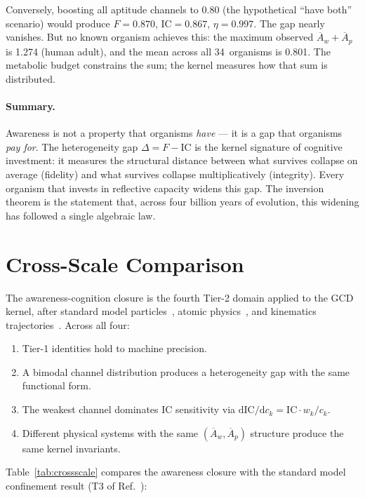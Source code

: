 \documentclass[
  aps,
  prd,
  twocolumn,
  superscriptaddress,
  nofootinbib,
  floatfix
]{revtex4-2}
\newcommand{\dd}{\mathrm{d}}
\newcommand{\IC}{\mathrm{IC}}
\newcommand{\Aw}{\overline{A}_{\!w}}
\newcommand{\Ap}{\overline{A}_{\!p}}
\begin{document}
Conversely, boosting all aptitude channels to $0.80$
(the hypothetical ``have both'' scenario) would produce
$F = 0.870$, $\IC = 0.867$, $\eta = 0.997$.  The gap
nearly vanishes.  But no known organism achieves this:
the maximum observed $\Aw + \Ap$ is 1.274 (human adult),
and the mean across all 34~organisms is 0.801.  The
metabolic budget constrains the sum; the kernel measures
how that sum is distributed.

\paragraph{Summary.}
Awareness is not a property that organisms \emph{have} ---
it is a gap that organisms \emph{pay for}.  The heterogeneity
gap $\Delta = F - \IC$ is the kernel signature of cognitive
investment: it measures the structural distance between what
survives collapse on average (fidelity) and what survives
collapse multiplicatively (integrity).  Every organism that
invests in reflective capacity widens this gap.  The inversion
theorem is the statement that, across four billion years of
evolution, this widening has followed a single algebraic law.

\section{Cross-Scale Comparison}\label{sec:crossscale}

The awareness-cognition closure is the fourth Tier-2 domain
applied to the GCD kernel, after standard model
particles~\cite{paulus2026sm}, atomic
physics~\cite{paulus2025physicscoherence}, and kinematics
trajectories~\cite{paulus2026kinematics}.  Across all four:

\begin{enumerate}
\item Tier-1 identities hold to machine precision.
\item A bimodal channel distribution produces a heterogeneity
  gap with the same functional form.
\item The weakest channel dominates $\IC$ sensitivity via
  $\dd\IC/\dd c_k = \IC \cdot w_k / c_k$.
\item Different physical systems with the same $(\Aw, \Ap)$
  structure produce the same kernel invariants.
\end{enumerate}

Table~\ref{tab:crossscale} compares the awareness closure
with the standard model confinement result (T3 of
Ref.~\cite{paulus2026sm}):
\end{document}
